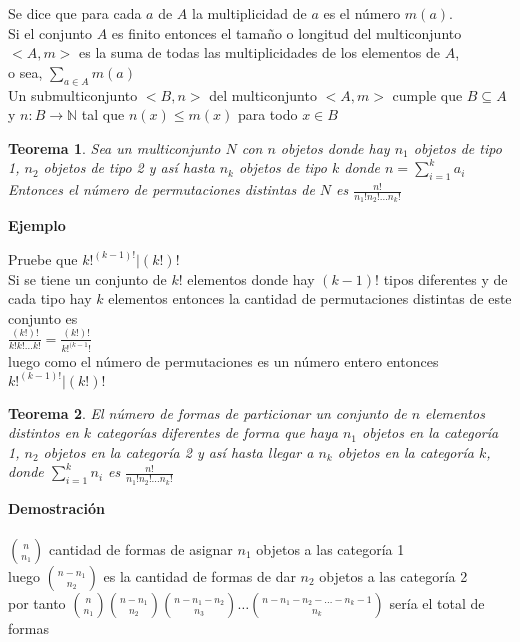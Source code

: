 \documentclass[a4paper,12pt]{report}
\newtheorem*{teo}{Teorema}
\begin{document}
Se dice que para cada $a$ de $A$ la multiplicidad de $a$ es el número $m(a)$.\\

Si el conjunto $A$ es finito entonces el tamaño o longitud del multiconjunto $<A,m>$ es la suma de todas las multiplicidades de los elementos de $A$,\\ o sea, $\sum_{a\in A}m(a)$\\

Un submulticonjunto $<B,n>$ del multiconjunto $<A,m>$ cumple que $B\subseteq A$ y $n:B\rightarrow \mathbb{N}$ tal que $n(x)\leq m(x)$ para todo $x\in B$ 

\begin{teo}
 Sea un multiconjunto $N$ con $n$ objetos donde hay $n_1$ objetos de tipo 1, $n_2$ objetos de tipo 2 y así hasta $n_k$ objetos de tipo $k$ donde $n=\sum^k_{i=1}a_i$\\
 Entonces el número de permutaciones distintas de $N$ es $\frac{n!}{n_1! n_2! \dots n_k!}$
\end{teo}

\textbf{Ejemplo}

Pruebe que $k!^{(k-1)!}|(k!)!$\\

Si se tiene un conjunto de $k!$ elementos donde hay $(k-1)!$ tipos diferentes y de cada tipo hay $k$ elementos entonces la cantidad de permutaciones distintas de este conjunto es\\

$\frac{(k!)!}{k!k!\dots k!}=\frac{(k!)!}{k!^{(k-1}!}$ \\

luego como el número de permutaciones es un número entero entonces $k!^{(k-1)!}|(k!)!$


\begin{teo}
 El número de formas de particionar un conjunto de $n$ elementos distintos en $k$ categorías diferentes de forma que haya $n_1$ objetos en la categoría 1, $n_2$ objetos en la categoría 2 y así hasta llegar a $n_k$ objetos en la categoría $k$, donde $\sum^k_{i=1}n_i$ es $\frac{n!}{n_1!n_2!\dots n_k!}$
\end{teo}

\textbf{Demostración}\\\\
${n}\choose{n_1}$ cantidad de formas de asignar $n_1$ objetos a las categoría 1\\
luego ${n-n_1}\choose{n_2}$ es la cantidad de formas de dar $n_2$ objetos a las categoría 2\\
por tanto ${n}\choose{n_1}$${n-n_1}\choose{n_2}$${n-n_1-n_2}\choose{n_3}$$\dots$${n-n_1-n_2-\dots-n_k-1}\choose{n_k}$ sería el total de formas\\
\end{document}
